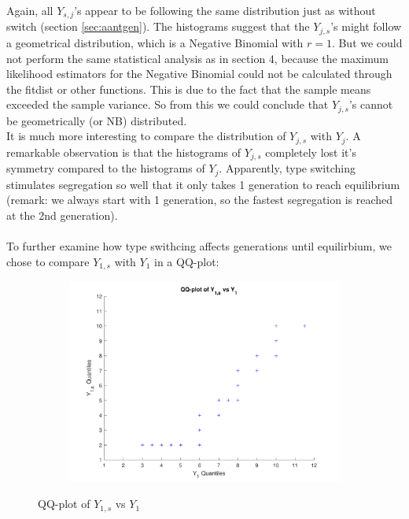 Again, all $Y_{s,j}$'s appear to be following the same distribution just as without switch (section \ref{sec:aantgen}). 
The histograms suggest that the $Y_{j,s}$'s might follow a geometrical distribution, which is a Negative Binomial with $r=1$. 
But we could not perform the same statistical analysis as in section 4, because the maximum likelihood estimators for the Negative Binomial could not be calculated through the fitdist or other functions. 
This is due to the fact that the sample means exceeded the sample variance. So from this we could conclude that $Y_{j,s}$'s cannot be geometrically (or NB) distributed.\\

It is much more interesting to compare the distribution of $Y_{j,s}$ with $Y_{j}$. A remarkable observation is that the histograms of $Y_{j,s}$ completely lost it's symmetry compared to the histograms of $Y_j$. 
Apparently, type switching stimulates segregation so well that it only takes 1 generation to reach equilibrium (remark: we always start with 1 generation, so the fastest segregation is reached at the 2nd generation).\\
\\ 
To further examine how type swithcing affects generations until equilirbium, we chose to compare $Y_{1,s}$ with $Y_1$ in a QQ-plot:

\begin{figure}[H]
    \centering
    \begin{subfigure}{0.8\textwidth}
        \includegraphics[width=\textwidth]{QQplotY1sw.pdf}
    \end{subfigure}
    \caption{QQ-plot of $Y_{1,s}$ vs $Y_1$}
    \label{fig:QQplotSw}
\end{figure}  

